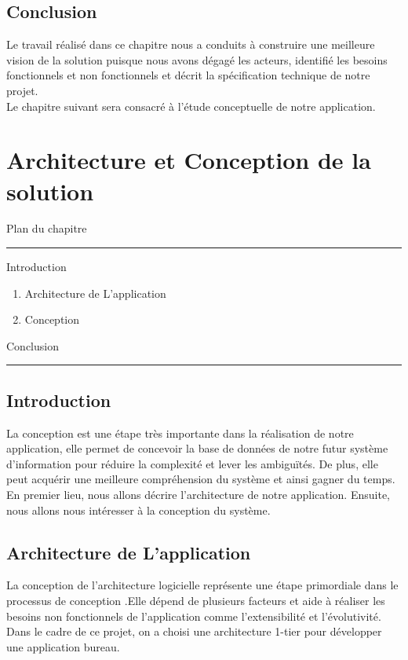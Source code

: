 \documentclass[12pt]{report}
\begin{document}
\section*{Conclusion}
Le travail réalisé dans ce chapitre nous a conduits à construire une meilleure vision de la solution puisque nous avons dégagé les acteurs, identifié les besoins fonctionnels et non fonctionnels et décrit la spécification technique de notre projet.
\\
Le chapitre suivant sera consacré à l'étude conceptuelle de notre application.

\chapter{Architecture et Conception de la solution}
\vspace{100pt}
\begin{center}
Plan du chapitre
\end{center}

\hrule
\vspace{20pt}
Introduction
\begin{enumerate}
	\item Architecture de L'application
	\item Conception
\end{enumerate}

Conclusion
\vspace{20pt}
\hrule
\newpage
\newpage
\section*{Introduction}
La conception est une étape très importante dans la réalisation de notre application, elle permet de concevoir la base de données de notre futur système d'information pour réduire la complexité et lever les ambiguïtés. De plus, elle peut acquérir une meilleure compréhension du système et ainsi gagner du temps.\\
En premier lieu, nous allons décrire l'architecture de notre application. Ensuite, nous allons nous intéresser à la conception du système.
\section{Architecture de L'application}
La conception de l'architecture logicielle représente une étape primordiale dans le processus de conception .Elle dépend de plusieurs facteurs et aide à réaliser les besoins non fonctionnels de l'application comme l'extensibilité et l'évolutivité.\\
Dans le cadre de ce projet, on a choisi une architecture 1-tier pour développer une application bureau.
\end{document}
